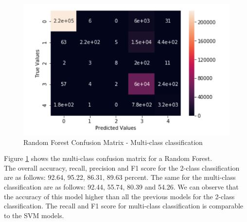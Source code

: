 \begin{figure}
	\includegraphics[width=1.0\columnwidth]{images/rfall.PNG}
	\caption{Random Forest Confusion Matrix - Multi-class classification}
	\label{F:rfall}
\end{figure}
Figure \ref{F:rfall} shows the multi-class confusion matrix for a Random Forest.\\
The overall accuracy, recall, precision and F1 score for the 2-class classification are as follows: 92.64, 95.22, 86.31, 89.63 percent. The same for the multi-class classification are as follows: 92.44, 55.74, 80.39
and 54.26. We can observe that the accuracy of this model higher than all the previous models for the 2-class classification. The recall and F1 score for multi-class classification is comparable to the SVM models.

